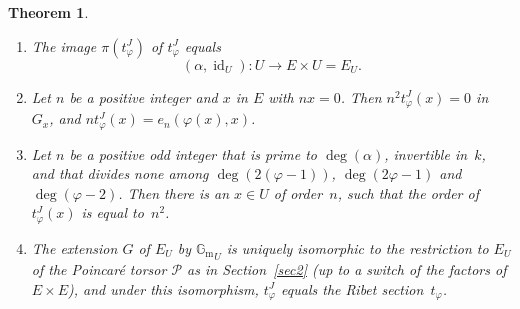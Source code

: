 \documentclass[11pt]{article}
\newcommand{\skpt}{\smallskip}
\providecommand{\G}{}
\let\mathcal\mathscr
\theoremstyle{plain}
\newtheorem{Theorem}[subsection]{Theorem}
\theoremstyle{definition}
\numberwithin{equation}{subsection}
\let\phi\varphi
\renewcommand{\G}{\mathbb G}
\newcommand{\calP}{\mathcal{P}}
\newcommand{\Gm}{\G_{\mathrm{m}}}
\DeclareMathOperator{\id}{id}
\begin{document}
\skpt
\begin{Theorem}\label{thm:tJ}
\begin{enumerate}
\item\label{thm:tJ1} The image $\pi(t^J_\phi)$ of $t^J_\phi$ equals
\[
(\alpha,\id_U)\colon U\to E\times U = E_U.
\]
\item\label{thm:tJ2} Let $n$ be a positive integer and $x$ in $E$ with $nx=0$.
Then $n^2t^J_\phi(x)=0$ in~$G_x$, and $nt^J_\phi(x) = e_n(\phi(x),x)$.
\item\label{thm:tJ3} Let $n$ be a positive odd integer that is prime to
$\deg(\alpha)$, invertible in~$k$, and that divides none among
$\deg(2(\phi-1))$, $\deg(2\phi-1)$ and $\deg(\phi-2)$. Then there is
an $x\in U$ of order~$n$, such that the order of $t^J_\phi(x)$ is
equal to~$n^2$.
\item\label{thm:tJ4} The extension $G$ of $E_U$ by ${\Gm}_U$ is uniquely isomorphic
to the restriction to $E_U$ of the Poincaré torsor $\calP$ as in
Section~\ref{sec2} (up to a switch of the factors of $E \times E$),
and under this isomorphism, $t^J_\phi$ equals the Ribet
section~$t_\phi$.
\end{enumerate}
\end{Theorem}
\end{document}
